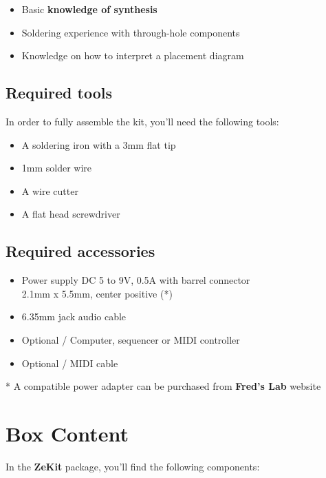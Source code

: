 \documentclass{scrartcl}
\begin{document}
\begin{itemize}
    \item Basic \textbf{knowledge of synthesis}
    \item Soldering experience with through-hole components
    \item Knowledge on how to interpret a placement diagram
\end{itemize}

\subsection{Required tools}

In order to fully assemble the kit, you'll need the following tools:

\begin{itemize}
    \item A soldering iron with a 3mm flat tip
    \item 1mm solder wire
    \item A wire cutter
    \item A flat head screwdriver
\end{itemize}

\subsection{Required accessories}

\begin{itemize}
    \item Power supply DC 5 to 9V, 0.5A with barrel connector \\
    2.1mm x 5.5mm, center positive (*)
    \item 6.35mm jack audio cable
    \item Optional / Computer, sequencer or MIDI controller
    \item Optional / MIDI cable
\end{itemize}

* A compatible power adapter can be purchased from \textbf{Fred's Lab} website

\pagebreak
\section{Box Content}

In the \textbf{ZeKit} package, you'll find the following components:
\vspace{-0.25cm}
\end{document}

